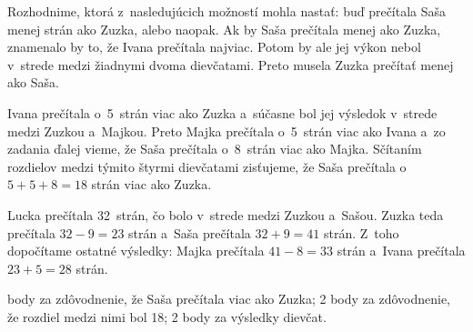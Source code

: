 {%
Rozhodnime, ktorá z~nasledujúcich možností mohla nastať: buď prečítala
Saša menej strán ako Zuzka, alebo naopak. Ak by Saša prečítala menej
ako Zuzka, znamenalo by to, že Ivana prečítala najviac.
Potom by ale jej výkon nebol v~strede medzi žiadnymi dvoma dievčatami.
Preto musela Zuzka prečítať menej ako Saša.

Ivana prečítala o~5~strán viac ako Zuzka a~súčasne bol jej výsledok
v~strede medzi Zuzkou a~Majkou. Preto Majka prečítala o~5~strán viac
ako Ivana a~zo zadania ďalej vieme, že Saša prečítala o~8~strán viac ako
Majka. Sčítaním rozdielov medzi týmito štyrmi dievčatami zisťujeme, že
Saša prečítala o~$5+5+8=18$ strán viac ako Zuzka.
%

Lucka prečítala 32~strán, čo bolo v~strede medzi Zuzkou a~Sašou.
Zuzka teda prečítala $32-9=23$ strán a~Saša prečítala $32+9=41$ strán.
Z~toho dopočítame ostatné výsledky:
Majka prečítala $41-8=33$ strán a~Ivana prečítala $23+5=28$ strán.

 body za zdôvodnenie, že Saša prečítala viac ako Zuzka;
2 body za zdôvodnenie, že rozdiel medzi nimi bol 18;
2 body za výsledky dievčat.
\endhodnotenie
}

